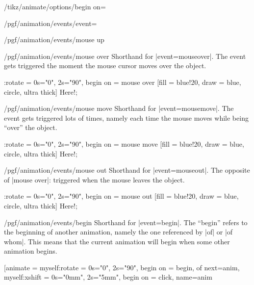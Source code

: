 \begin{key}{/tikz/animate/options/begin on=}
\begin{key}{/pgf/animation/events/event=}
\begin{key}{/pgf/animation/events/mouse up}
        \end{key}
        \begin{key}{/pgf/animation/events/mouse over}
            Shorthand for |event=mouseover|. The event gets triggered the
            moment the mouse cursor moves over the object.
\begin{codeexample}[imagesource={standalone/pgfmanual-en-tikz-animations-animation-63.svg}]
\tikz \node :rotate = { 0s="0", 2s="90", begin on = {mouse over} }
  [fill = blue!20, draw = blue, circle, ultra thick] {Here!};
\end{codeexample}
        \end{key}
        \begin{key}{/pgf/animation/events/mouse move}
            Shorthand for |event=mousemove|. The event gets triggered lots of
            times, namely each time the mouse moves while being ``over'' the
            object.
\begin{codeexample}[imagesource={standalone/pgfmanual-en-tikz-animations-animation-64.svg}]
\tikz \node :rotate = { 0s="0", 2s="90", begin on = {mouse move} }
  [fill = blue!20, draw = blue, circle, ultra thick] {Here!};
\end{codeexample}
        \end{key}
        \begin{key}{/pgf/animation/events/mouse out}
            Shorthand for |event=mouseout|. The opposite of |mouse over|:
            triggered when the mouse leaves the object.
\begin{codeexample}[imagesource={standalone/pgfmanual-en-tikz-animations-animation-65.svg}]
\tikz \node :rotate = { 0s="0", 2s="90", begin on = {mouse out} }
  [fill = blue!20, draw = blue, circle, ultra thick] {Here!};
\end{codeexample}
        \end{key}
        \begin{key}{/pgf/animation/events/begin}
            Shorthand for |event=begin|. The ``begin'' refers to the beginning
            of another animation, namely the one referenced by |of| or
            |of whom|. This means that the current animation will begin when
            some other animation begins.
\begin{codeexample}[imagesource={standalone/pgfmanual-en-tikz-animations-animation-66.svg}]
\tikz \node [animate = {
      myself:rotate = { 0s="0", 2s="90", begin on = {begin, of next=anim}},
      myself:xshift = { 0s="0mm", 2s="5mm", begin on = {click}, name=anim}
}
\end{codeexample}
\end{key}
\end{key}
\end{key}
